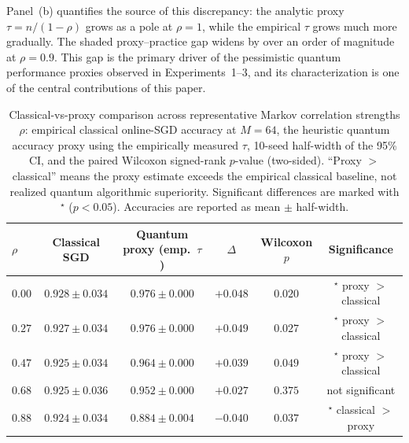 \documentclass[preprint,12pt,authoryear]{elsarticle}
\begin{document}
Panel~(b) quantifies the source of this discrepancy: the analytic proxy $\tau = n/(1{-}\rho)$ grows as a pole at $\rho = 1$, while the empirical $\tau$ grows much more gradually. The shaded proxy--practice gap widens by over an order of magnitude at $\rho = 0.9$. This gap is the primary driver of the pessimistic quantum performance proxies observed in Experiments~1--3, and its characterization is one of the central contributions of this paper.

\begin{table}[t]
\centering
\caption{Classical-vs-proxy comparison across representative Markov correlation strengths $\rho$: empirical classical online-SGD accuracy at $M = 64$, the heuristic quantum accuracy proxy using the empirically measured $\tau$, 10-seed half-width of the 95\% CI, and the paired Wilcoxon signed-rank $p$-value (two-sided). ``Proxy $>$ classical'' means the proxy estimate exceeds the empirical classical baseline, not realized quantum algorithmic superiority. Significant differences are marked with $^{\star}$ ($p < 0.05$). Accuracies are reported as mean $\pm$ half-width.}
\label{tab:markov_summary}
\begin{tabular}{lccccc}
\hline
$\rho$ & Classical SGD & Quantum proxy (emp.\ $\tau$) & $\Delta$ & Wilcoxon $p$ & Significance \\
\hline
$0.00$ & $0.928 \pm 0.034$ & $0.976 \pm 0.000$ & $+0.048$ & $0.020$ & $^{\star}$ proxy $>$ classical \\
$0.27$ & $0.927 \pm 0.034$ & $0.976 \pm 0.000$ & $+0.049$ & $0.027$ & $^{\star}$ proxy $>$ classical \\
$0.47$ & $0.925 \pm 0.034$ & $0.964 \pm 0.000$ & $+0.039$ & $0.049$ & $^{\star}$ proxy $>$ classical \\
$0.68$ & $0.925 \pm 0.036$ & $0.952 \pm 0.000$ & $+0.027$ & $0.375$ & not significant \\
$0.88$ & $0.924 \pm 0.034$ & $0.884 \pm 0.004$ & $-0.040$ & $0.037$ & $^{\star}$ classical $>$ proxy \\
\hline
\end{tabular}
\end{table}
\end{document}
